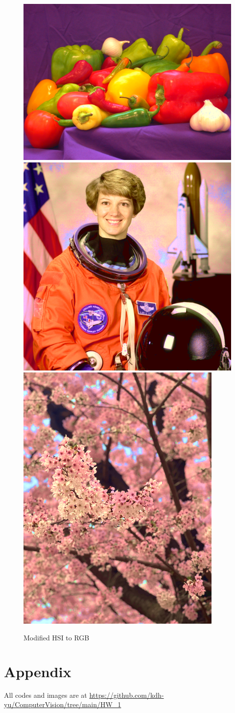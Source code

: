 \documentclass{article}
\begin{document}
\begin{figure}[!ht]
    \centering
    \includegraphics[width=.356\textwidth]{fig/HSI2RGB_peppers.png}
    \includegraphics[width=.267\textwidth]{fig/HSI2RGB_astronaut.png}
    \includegraphics[width=.2\textwidth]{fig/HSI2RGB_cb.png}
    \caption{Modified HSI to RGB}
\end{figure}


\section*{Appendix}
All codes and images are at \url{https://github.com/kdh-yu/ComputerVision/tree/main/HW_1}
\end{document}
